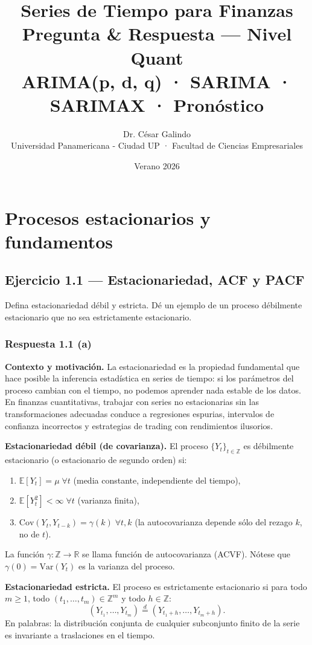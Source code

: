 \documentclass[12pt, letterpaper]{article}
\title{Series de Tiempo para Finanzas \\ Pregunta \& Respuesta — Nivel Quant \\ ARIMA(p, d, q) · SARIMA · SARIMAX · Pronóstico}
\author{Dr. César Galindo \\ Universidad Panamericana - Ciudad UP · Facultad de Ciencias Empresariales}
\date{Verano 2026}
\begin{document}
\maketitle

\tableofcontents
\newpage

\section{Procesos estacionarios y fundamentos}

\subsection{Ejercicio 1.1 — Estacionariedad, ACF y PACF}

Defina estacionariedad débil y estricta. Dé un ejemplo de un proceso débilmente estacionario que no sea estrictamente estacionario.

\subsubsection*{Respuesta 1.1 (a)}

\textbf{Contexto y motivación.} La estacionariedad es la propiedad fundamental que hace posible la inferencia estadística en series de tiempo: si los parámetros del proceso cambian con el tiempo, no podemos aprender nada estable de los datos. En finanzas cuantitativas, trabajar con series no estacionarias sin las transformaciones adecuadas conduce a regresiones espurias, intervalos de confianza incorrectos y estrategias de trading con rendimientos ilusorios.

\textbf{Estacionariedad débil (de covarianza).} El proceso $\{Y_t\}_{t\in\mathbb{Z}}$ es débilmente estacionario (o estacionario de segundo orden) si:
\begin{enumerate}[label=(\roman*)]
    \item $\mathbb{E}[Y_t] = \mu \; \forall t$ (media constante, independiente del tiempo),
    \item $\mathbb{E}[Y_t^2] < \infty \; \forall t$ (varianza finita),
    \item $\text{Cov}(Y_t, Y_{t-k}) = \gamma(k) \; \forall t,k$ (la autocovarianza depende sólo del rezago $k$, no de $t$).
\end{enumerate}
La función $\gamma: \mathbb{Z} \to \mathbb{R}$ se llama función de autocovarianza (ACVF). Nótese que $\gamma(0) = \text{Var}(Y_t)$ es la varianza del proceso.

\textbf{Estacionariedad estricta.} El proceso es estrictamente estacionario si para todo $m \geq 1$, todo $(t_1, \dots, t_m) \in \mathbb{Z}^m$ y todo $h \in \mathbb{Z}$:
\[
(Y_{t_1}, \dots, Y_{t_m}) \stackrel{d}{=} (Y_{t_1+h}, \dots, Y_{t_m+h}).
\]
En palabras: la distribución conjunta de cualquier subconjunto finito de la serie es invariante a traslaciones en el tiempo.
\end{document}
